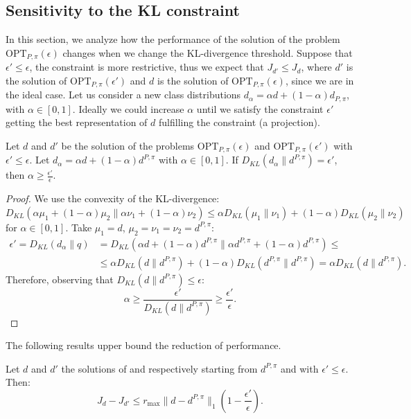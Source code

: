 \subsection{Sensitivity to the KL constraint}
In this section, we analyze how the performance of the solution of the problem $\text{OPT}_{P,\pi}(\epsilon)$ changes when we change the KL-divergence threshold. Suppose that $\epsilon' \leq \epsilon$, the constraint is more restrictive, thus we expect that $J_{d'} \leq J_{d}$, where $d'$ is the solution of $\text{OPT}_{P,\pi}(\epsilon')$ and $d$ is the solution of $\text{OPT}_{P,\pi}(\epsilon)$, since we are in the ideal case. Let us consider a new class distributions $d_\alpha = \alpha d + (1-\alpha) d_{P,\pi}$, with $\alpha \in [0,1]$. Ideally we could increase $\alpha$ until we satisfy the constraint $\epsilon'$ getting the best representation of $d$ fulfilling the constraint (a projection).
\begin{lemma}
\label{L:alphaBound}
	Let $d$ and $d'$ be the solution of the problems $\text{OPT}_{P,\pi}(\epsilon)$ and $\text{OPT}_{P,\pi}(\epsilon')$ with $\epsilon' \leq \epsilon$. Let $d_\alpha = \alpha d + (1-\alpha) d^{P,\pi}$ with $\alpha \in [0,1]$. If $D_{KL}(d_\alpha \| d^{P,\pi}) = \epsilon'$, then $\alpha \geq \frac{\epsilon'}{\epsilon}$.
\end{lemma}
	\begin{proof}
		We use the convexity of the KL-divergence:
		 $D_{KL}(\alpha \mu_1 + (1-\alpha) \mu_2 \|  \alpha \nu_1 + (1-\alpha) \nu_2) \le \alpha D_{KL}(\mu_1 \| \nu_1) + (1-\alpha) D_{KL}(\mu_2 \| \nu_2)$ for $\alpha \in [0,1]$. Take $\mu_1 = d$, $\mu_2 = \nu_1 = \nu_2 = d^{P,\pi}$:
	\begin{align*}
		\epsilon' = D_{KL}(d_{\alpha} \| q) & = D_{KL} (\alpha d + (1-\alpha) d^{P,\pi} \| \alpha d^{P,\pi} + (1-\alpha) d^{P,\pi}) \le \\
		& \le \alpha D_{KL} (d \| d^{P,\pi}) + (1-\alpha) D_{KL} (d^{P,\pi} \| d^{P,\pi}) = \alpha D_{KL} (d \| d^{P,\pi}).
	\end{align*}
	Therefore, observing that $D_{KL} (d \| d^{P,\pi}) \le \epsilon$:
	\begin{equation}
		\alpha \ge \frac{\epsilon'}{D_{KL} (d \| d^{P,\pi})} \ge \frac{\epsilon'}{\epsilon}.
	\end{equation}
\end{proof}
The following results upper bound the reduction of performance.
\begin{prop}
	Let $d$ and $d'$ the solutions of \opt{\epsilon} and  respectively starting from $d^{P,\pi}$ and with $\epsilon' \le \epsilon$. Then:
	\begin{equation}
		J_d - J_{d'} \le r_{\max} \| d - d^{P,\pi} \|_1 \left( 1 - \frac{\epsilon'}{\epsilon} \right) .
	\end{equation}
\end{prop}
